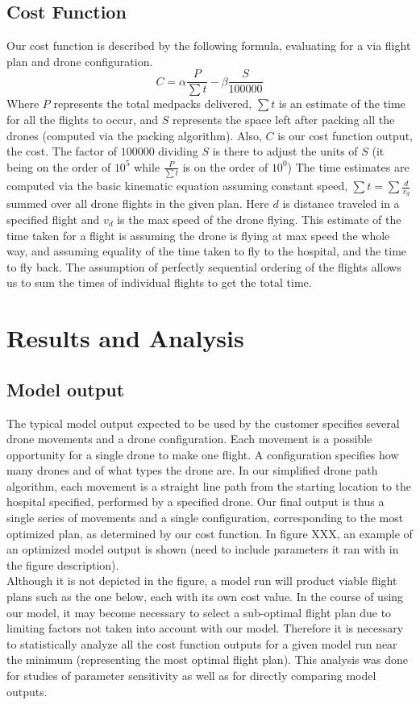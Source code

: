 \documentclass[twocolumn,10pt]{asme2ej}
\begin{document}
\subsection{Cost Function}
Our cost function is described by the following formula, evaluating for a via flight plan and drone configuration.
\[
C = \alpha \frac{P}{\sum{t}} - \beta \frac{S}{100000}
\]
Where $P$ represents the total medpacks delivered, $\sum{t}$ is an estimate of the time for all the flights to occur, and $S$ represents the space left after packing all the drones (computed via the packing algorithm). Also, $C$ is our cost function output, the cost. The factor of $100000$ dividing $S$ is there to adjust the units of $S$ (it being on the order of $10^5$ while $\frac{P}{\sum{t}}$ is on the order of $10^0$) The time estimates are computed via the basic kinematic equation assuming constant speed, $\sum{t}=\sum{\frac{d}{v_d}}$ summed over all drone flights in the given plan. Here $d$ is distance traveled in a specified flight and $v_d$ is the max speed of the drone flying. This estimate of the time taken for a flight is assuming the drone is flying at max speed the whole way, and assuming equality of the time taken to fly to the hospital, and the time to fly back. The assumption of perfectly sequential ordering of the flights allows us to sum the times of individual flights to get the total time.

\section{Results and Analysis}

\subsection{Model output}
The typical model output expected to be used by the customer specifies several drone movements and a drone configuration. Each movement is a possible opportunity for a single drone to make one flight. A configuration specifies how many drones and of what types the drone are. In our simplified drone path algorithm, each movement is a straight line path from the starting location to the hospital specified, performed by a specified drone. Our final output is thus a single series of movements and a single configuration, corresponding to the most optimized plan, as determined by our cost function. In figure XXX, an example of an optimized model output is shown (need to include parameters it ran with in the figure description). \\
Although it is not depicted in the figure, a model run will product viable flight plans such as the one below, each with its own cost value. In the course of using our model, it may become necessary to select a sub-optimal flight plan due to limiting factors not taken into account with our model. Therefore it is necessary to statistically analyze all the cost function outputs for a given model run near the minimum (representing the most optimal flight plan). This analysis was done for studies of parameter sensitivity as well as for directly comparing model outputs.
\end{document}
